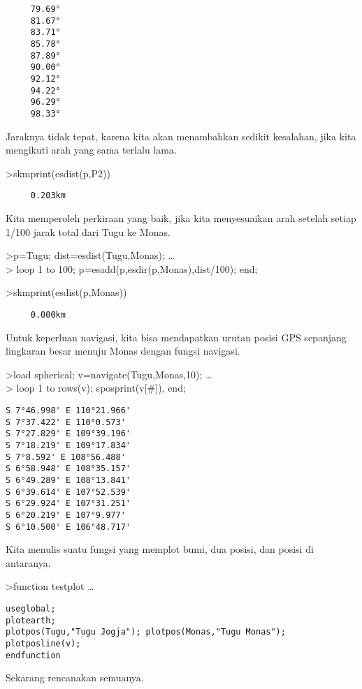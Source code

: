\documentclass[
]{book}
\begin{document}
\begin{verbatim}
     79.69°
     81.67°
     83.71°
     85.78°
     87.89°
     90.00°
     92.12°
     94.22°
     96.29°
     98.33°
\end{verbatim}

Jaraknya tidak tepat, karena kita akan menambahkan sedikit kesalahan, jika kita mengikuti arah yang sama terlalu lama.

\textgreater skmprint(esdist(p,P2))

\begin{verbatim}
     0.203km
\end{verbatim}

Kita memperoleh perkiraan yang baik, jika kita menyesuaikan arah setelah setiap 1/100 jarak total dari Tugu ke Monas.

\textgreater p=Tugu; dist=esdist(Tugu,Monas); \ldots{}\\
\textgreater{} loop 1 to 100; p=esadd(p,esdir(p,Monas),dist/100); end;

\textgreater skmprint(esdist(p,Monas))

\begin{verbatim}
     0.000km
\end{verbatim}

Untuk keperluan navigasi, kita bisa mendapatkan urutan posisi GPS sepanjang lingkaran besar menuju Monas dengan fungsi navigasi.

\textgreater load spherical; v=navigate(Tugu,Monas,10); \ldots{}\\
\textgreater{} loop 1 to rows(v); sposprint(v{[}\#{]}), end;

\begin{verbatim}
S 7°46.998' E 110°21.966'
S 7°37.422' E 110°0.573'
S 7°27.829' E 109°39.196'
S 7°18.219' E 109°17.834'
S 7°8.592' E 108°56.488'
S 6°58.948' E 108°35.157'
S 6°49.289' E 108°13.841'
S 6°39.614' E 107°52.539'
S 6°29.924' E 107°31.251'
S 6°20.219' E 107°9.977'
S 6°10.500' E 106°48.717'
\end{verbatim}

Kita menulis suatu fungsi yang memplot bumi, dua posisi, dan posisi di antaranya.

\textgreater function testplot \ldots{}

\begin{verbatim}
useglobal;
plotearth;
plotpos(Tugu,"Tugu Jogja"); plotpos(Monas,"Tugu Monas");
plotposline(v);
endfunction
\end{verbatim}

Sekarang rencanakan semuanya.
\end{document}
